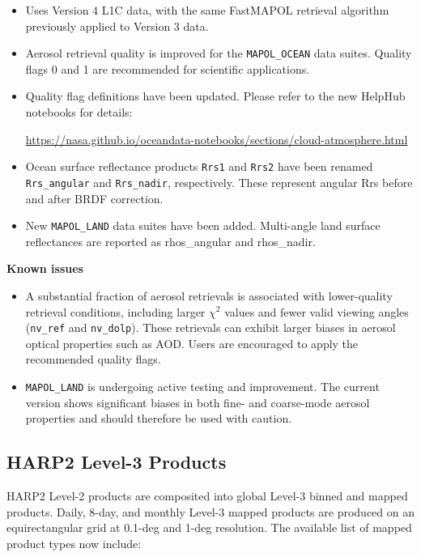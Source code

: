\documentclass[
  11pt,
  letterpaper,
]{scrreprt}
\begin{document}
\begin{itemize}
\item
  Uses Version 4 L1C data, with the same FastMAPOL retrieval algorithm
  previously applied to Version 3 data.
\item
  Aerosol retrieval quality is improved for the \texttt{MAPOL\_OCEAN}
  data suites. Quality flags 0 and 1 are recommended for scientific
  applications.
\item
  Quality flag definitions have been updated. Please refer to the new
  HelpHub notebooks for details:

  \url{https://nasa.github.io/oceandata-notebooks/sections/cloud-atmosphere.html}
\item
  Ocean surface reflectance products \texttt{Rrs1} and \texttt{Rrs2}
  have been renamed \texttt{Rrs\_angular} and \texttt{Rrs\_nadir},
  respectively. These represent angular Rrs before and after BRDF
  correction.
\item
  New \texttt{MAPOL\_LAND} data suites have been added. Multi-angle land
  surface reflectances are reported as rhos\_angular and rhos\_nadir.
\end{itemize}

\textbf{Known issues}

\begin{itemize}
\item
  A substantial fraction of aerosol retrievals is associated with
  lower-quality retrieval conditions, including larger \(\chi^2\) values
  and fewer valid viewing angles (\texttt{nv\_ref} and
  \texttt{nv\_dolp}). These retrievals can exhibit larger biases in
  aerosol optical properties such as AOD. Users are encouraged to apply
  the recommended quality flags.
\item
  \texttt{MAPOL\_LAND} is undergoing active testing and improvement. The
  current version shows significant biases in both fine- and coarse-mode
  aerosol properties and should therefore be used with caution.
\end{itemize}

\subsection*{HARP2 Level-3 Products}\label{harp2-level-3-products}

HARP2 Level-2 products are composited into global Level-3 binned and
mapped products. Daily, 8-day, and monthly Level-3 mapped products are
produced on an equirectangular grid at 0.1-deg and 1-deg resolution. The
available list of mapped product types now include:
\end{document}
